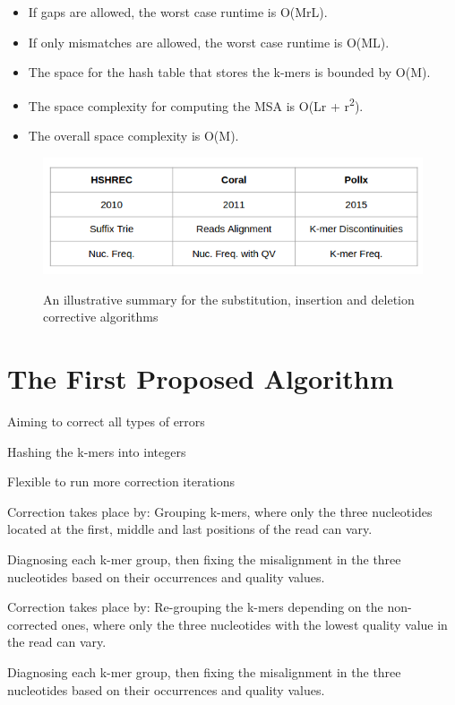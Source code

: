 \documentclass{llncs}
\begin{document}
\begin{itemize}
	\item If gaps are allowed, the worst case runtime is O(MrL).
	\item If only mismatches are allowed, the worst case runtime is O(ML).
	\item The space for the hash table that stores the k-mers is bounded by O(M).
	\item The space complexity for computing the MSA is O(Lr + r\textsuperscript{2}).
	\item The overall space complexity is O(M).
\end{itemize}
 
\begin{figure}
	\centering
	\includegraphics[width=.911\linewidth]{./figs/RW-2}
	\label{fig:fig13}
	\caption[caption]{An illustrative summary for the substitution, insertion and deletion corrective algorithms}
\end{figure}

\section{The First Proposed Algorithm}

Aiming to correct all types of errors

Hashing the k-mers into integers

Flexible to run more correction iterations

Correction takes place by:
Grouping k-mers, where only the three nucleotides located at the first, middle and last positions of the read can vary.

Diagnosing each k-mer group, then fixing the misalignment in the three nucleotides based on their occurrences and quality values.

Correction takes place by:
Re-grouping the k-mers depending on the non-corrected ones, where only the three nucleotides with the lowest quality value in the read can vary.

Diagnosing each k-mer group, then fixing the misalignment in the three nucleotides based on their occurrences and quality values.
\end{document}

